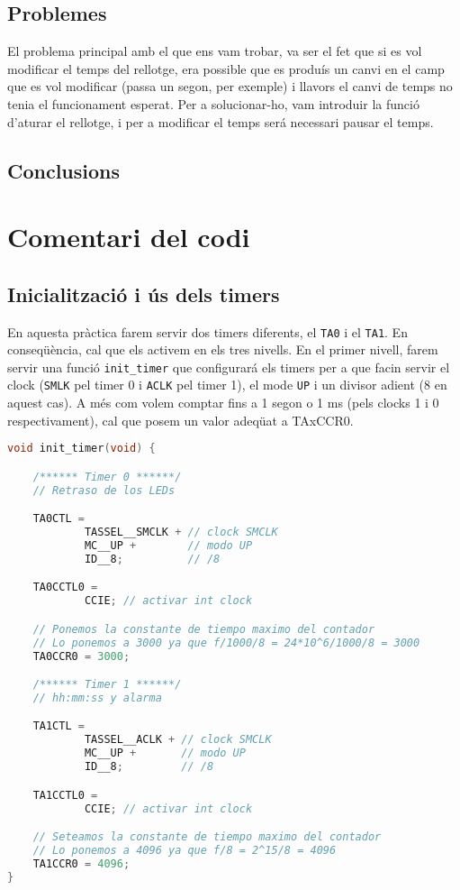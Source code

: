 \documentclass{../pdae} %
\begin{document}
\subsection{Problemes}
El problema principal amb el que ens vam trobar, va ser el fet que si es vol modificar el temps del rellotge, era possible que es produís un canvi en el camp que es vol modificar (passa un segon, per exemple) i llavors el canvi de temps no tenia el funcionament esperat. Per a solucionar-ho, vam introduir la funció d'aturar el rellotge, i per a modificar el temps será necessari pausar el temps.

\subsection{Conclusions}

\section{Comentari del codi}

\subsection{Inicialització i ús dels timers}

En aquesta pràctica farem servir dos timers diferents, el \texttt{TA0} i el \texttt{TA1}. En conseqüència, cal que els activem en els tres nivells.
En el primer nivell, farem servir una funció \texttt{init\_timer} que configurará els timers per a que facin servir el clock (\texttt{SMLK} pel timer 0 i \texttt{ACLK} pel timer 1), el mode \texttt{UP} i un divisor adient (8 en aquest cas). A més com volem comptar fins a 1 segon o 1 ms (pels clocks 1 i 0 respectivament), cal que posem un valor adeqüat a TAxCCR0.

\begin{lstlisting}[language=C]
void init_timer(void) {

    /****** Timer 0 ******/
    // Retraso de los LEDs

    TA0CTL =
            TASSEL__SMCLK + // clock SMCLK
            MC__UP +        // modo UP
            ID__8;          // /8

    TA0CCTL0 =
            CCIE; // activar int clock

    // Ponemos la constante de tiempo maximo del contador
    // Lo ponemos a 3000 ya que f/1000/8 = 24*10^6/1000/8 = 3000
    TA0CCR0 = 3000;

    /****** Timer 1 ******/
    // hh:mm:ss y alarma

    TA1CTL =
            TASSEL__ACLK + // clock SMCLK
            MC__UP +       // modo UP
            ID__8;         // /8

    TA1CCTL0 =
            CCIE; // activar int clock

    // Seteamos la constante de tiempo maximo del contador
    // Lo ponemos a 4096 ya que f/8 = 2^15/8 = 4096
    TA1CCR0 = 4096;
}
\end{lstlisting}
\end{document}
